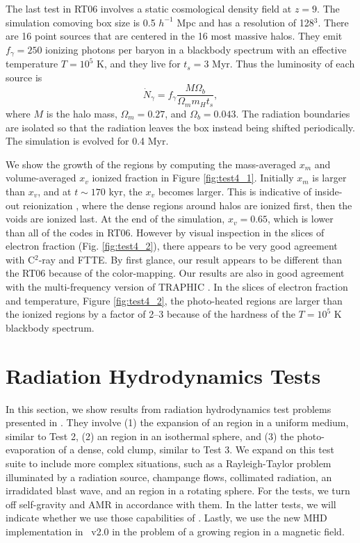 \documentclass[12pt,preprint]{aastex}
\begin{document}
The last test in RT06 involves a static cosmological density field at
$z=9$.  The simulation comoving box size is 0.5 $h^{-1}$ Mpc and has a
resolution of 128$^3$.  There are 16 point sources that are centered
in the 16 most massive halos.  They emit $f_\gamma = 250$ ionizing
photons per baryon in a blackbody spectrum with an effective
temperature $T = 10^5$ K, and they live for $t_s = 3$ Myr.  Thus the
luminosity of each source is
%
\begin{equation}
  \label{eqn:cosmo_lum}
  \dot{N}_\gamma = f_\gamma \frac{M \Omega_b} {\Omega_m m_H t_s},
\end{equation}
where $M$ is the halo mass, $\Omega_m = 0.27$, and $\Omega_b =
0.043$.  The radiation boundaries are isolated so that the radiation
leaves the box instead being shifted periodically.  The simulation is
evolved for 0.4 Myr.

We show the growth of the  regions by computing the
mass-averaged $x_m$ and volume-averaged $x_v$ ionized fraction in
Figure \ref{fig:test4_1}.  Initially $x_m$ is larger than $x_v$, and
at $t \sim 170$ kyr, the $x_v$ becomes larger.  This is indicative of
inside-out reionization \citep[e.g.][]{Gnedin00, Miralda00,
  Sokasian03}, where the dense regions around halos are ionized first,
then the voids are ionized last.  At the end of the simulation, $x_v =
0.65$, which is lower than all of the codes in RT06.  However by
visual inspection in the slices of electron fraction
(Fig. \ref{fig:test4_2}), there appears to be very good agreement with
C$^2$-ray and FTTE.  By first glance, our result appears to be
different than the RT06 because of the color-mapping.  Our results are
also in good agreement with the multi-frequency version of TRAPHIC
\citep[][see also for better representations of the electron fraction
  slices]{Pawlik10}.  In the slices of electron fraction and
temperature, Figure \ref{fig:test4_2}, the photo-heated regions are
larger than the ionized regions by a factor of 2--3 because of the
hardness of the $T = 10^5$ K blackbody spectrum.

\section{Radiation Hydrodynamics Tests}
\label{sec:radhydro}

In this section, we show results from radiation hydrodynamics test
problems presented in \citet[][hereafter RT09]{Iliev09}.  They involve
(1) the expansion of an  region in a uniform medium, similar
to Test 2, (2) an  region in an isothermal sphere, and (3)
the photo-evaporation of a dense, cold clump, similar to Test 3.  We
expand on this test suite to include more complex situations, such as
a Rayleigh-Taylor problem illuminated by a radiation source, champange
flows, collimated radiation, an irradidated blast wave, and an
 region in a rotating sphere.  For the \citeauthor{Iliev09}
tests, we turn off self-gravity and AMR in accordance with them.  In
the latter tests, we will indicate whether we use those capabilities
of \enzo.  Lastly, we use the new MHD implementation in \enzo~v2.0 in
the problem of a growing  region in a magnetic field.
\end{document}

